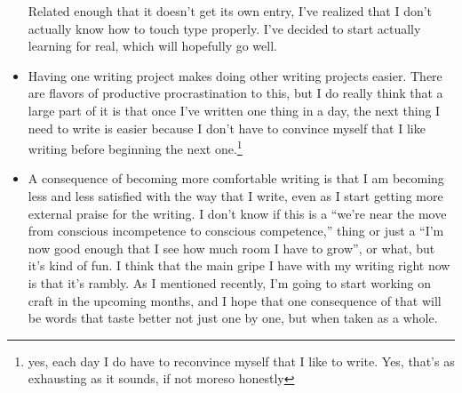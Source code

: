 \documentclass[12pt]{article}[titlepage]
\newcommand{\say}[1]{``#1''}
\newcommand{\1}{\={a}}
\newcommand{\2}{\={e}}
\newcommand{\3}{\={\i}}
\newcommand{\4}{\=o}
\newcommand{\5}{\=u}
\newcommand{\6}{\={A}}
\renewcommand{\,}{\textsuperscript{,}}
\begin{document}
\begin{itemize}
Related enough that it doesn't get its own entry, I've realized that I don't actually know how to touch type properly.
I've decided to start actually learning for real, which will hopefully go well.
\item Having one writing project makes doing other writing projects easier.
There are flavors of productive procrastination to this, but I do really think that a large part of it is that once I've written one thing in a day, the next thing I need to write is easier because I don't have to convince myself that I like writing before beginning the next one.\footnote{yes, each day I do have to reconvince myself that I like to write.
Yes, that's as exhausting as it sounds, if not moreso honestly}
\item A consequence of becoming more comfortable writing is that I am becoming less and less satisfied with the way that I write, even as I start getting more external praise for the writing.
I don't know if this is a \say{we're near the move from conscious incompetence to conscious competence,} thing or just a \say{I'm now good enough that I see how much room I have to grow}, or what, but it's kind of fun.
I think that the main gripe I have with my writing right now is that it's rambly.
As I mentioned recently, I'm going to start working on craft in the upcoming months, and I hope that one consequence of that will be words that taste better not just one by one, but when taken as a whole. 
\end{itemize}
 
\end{document}
